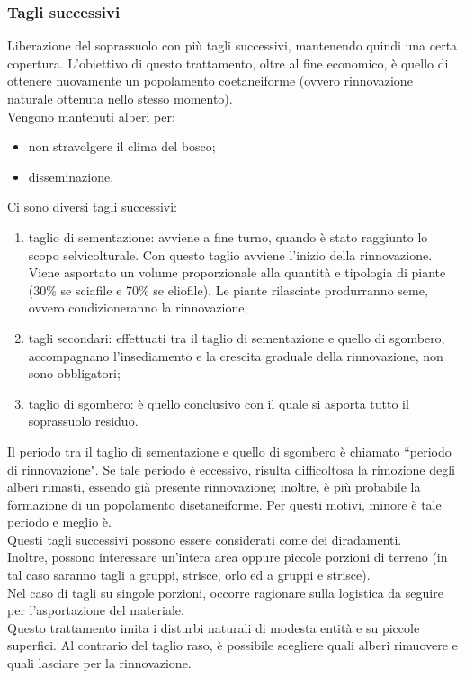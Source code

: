 \documentclass{article}
\begin{document}
\subsubsection{Tagli successivi}
Liberazione del soprassuolo con più tagli successivi, mantenendo quindi una certa copertura. L'obiettivo di questo trattamento, oltre al fine economico, è quello di ottenere nuovamente un popolamento coetaneiforme (ovvero rinnovazione naturale ottenuta nello stesso momento).\\
Vengono mantenuti alberi per:
\begin{itemize}
    \item non stravolgere il clima del bosco;
    \item disseminazione.
\end{itemize}
Ci sono diversi tagli successivi: 
\begin{enumerate}
    \item taglio di sementazione: avviene a fine turno, quando è stato raggiunto lo scopo selvicolturale. Con questo taglio avviene l'inizio della rinnovazione. Viene asportato un volume proporzionale alla quantità e tipologia di piante (30\% se sciafile e 70\% se eliofile). Le piante rilasciate produrranno seme, ovvero condizioneranno la rinnovazione;
    \item tagli secondari: effettuati tra il taglio di sementazione e quello di sgombero, accompagnano l'insediamento e la crescita graduale della rinnovazione, non sono obbligatori;
    \item taglio di sgombero: è quello conclusivo con il quale si asporta tutto il soprassuolo residuo.
\end{enumerate}
Il periodo tra il taglio di sementazione e quello di sgombero è chiamato ``periodo di rinnovazione". Se tale periodo è eccessivo, risulta difficoltosa la rimozione degli alberi rimasti, essendo già presente rinnovazione; inoltre, è più probabile la formazione di un popolamento disetaneiforme. Per questi motivi, minore è tale periodo e meglio è.\\
Questi tagli successivi possono essere considerati come dei diradamenti.\\
Inoltre, possono interessare un'intera area oppure piccole porzioni di terreno (in tal caso saranno tagli a gruppi, strisce, orlo ed a gruppi e strisce).\\
Nel caso di tagli su singole porzioni, occorre ragionare sulla logistica da seguire per l'asportazione del materiale.\\
Questo trattamento imita i disturbi naturali di modesta entità e su piccole superfici. Al contrario del taglio raso, è possibile scegliere quali alberi rimuovere e quali lasciare per la rinnovazione.\\
\end{document}
